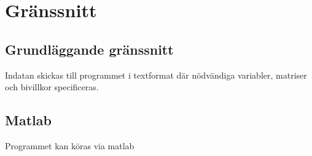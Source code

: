 \section{Gränssnitt}

\subsection{Grundläggande gränssnitt}
Indatan skickas till programmet i textformat där nödvändiga variabler, matriser och bivillkor specificeras.

\subsection{Matlab}
Programmet kan köras via matlab